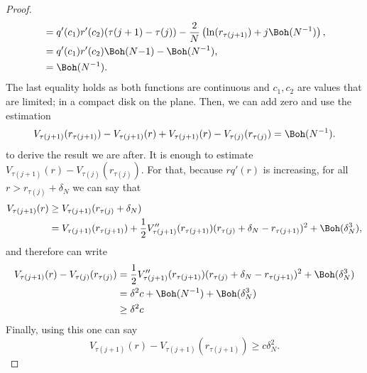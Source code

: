 \begin{proof}
\begin{align}
		& = q'(c_1) r'(c_2) (\tau(j+1) - \tau(j)) - \frac{2}{N} \left(\ln(r_{\tau(j+1)})+j \Boh(N^{-1}) \right), \\
		& = q'(c_1) r'(c_2) \Boh(N{-1}) - \Boh(N^{-1}), \\
		& = \Boh(N^{-1}).
	\end{align}
	The last equality holds as both functions are continuous and $c_1, c_2$ are values that are limited; in a compact disk on the plane. Then, we can add zero and use the estimation
	\begin{equation}
		V_{\tau(j+1)}(r_{\tau(j+1)})  - V_{\tau(j+1)}(r) + V_{\tau(j+1)}(r) - V_{\tau(j)}(r_{\tau(j)}) = \Boh(N^{-1}).
	\end{equation}
	to derive the result we are after. It is enough to estimate $V_{\tau(j+1)}(r) - V_{\tau(j)}(r_{\tau(j)})$. For that, because $r q'(r)$ is increasing, for all $r > r_{\tau(j)} + \delta_N$ we can say that
	\begin{align}
		V_{\tau(j+1)}(r) & \geq V_{\tau(j+1)}(r_{\tau(j)} + \delta_N) \\
		& =  V_{\tau(j+1)}(r_{\tau(j+1)}) + \frac{1}{2} V''_{\tau(j+1)}(r_{\tau(j+1)}) (r_{\tau(j)} + \delta_N - r_{\tau(j+1)})^2 + \Boh(\delta_N^3),
	\end{align} 
	and therefore can write
	\begin{align}
		V_{\tau(j+1)}(r) - V_{\tau(j)}(r_{\tau(j)}) & =  \frac{1}{2} V''_{\tau(j+1)}(r_{\tau(j+1)}) (r_{\tau(j)} + \delta_N - r_{\tau(j+1)})^2 + \Boh(\delta_N^3) \\
		& = \delta^2 c + \Boh(N^{-1}) + \Boh(\delta_N^3) \\
		& \geq  \delta^2 c
	\end{align}
	Finally, using this one can say
	\begin{equation}
		V_{\tau(j+1)}(r) - V_{\tau(j+1)}(r_{\tau(j+1)}) \geq c \delta_N^2.
	\end{equation}


\end{proof}
